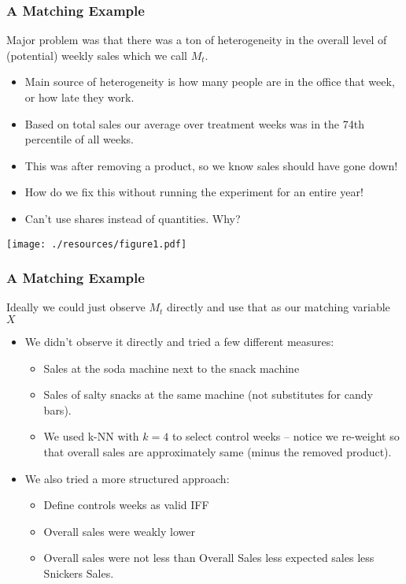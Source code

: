 \documentclass[xcolor=pdftex,dvipsnames,table,mathserif,aspectratio=169]{beamer}
\begin{document}
\begin{frame}
\frametitle{A Matching Example}
Major problem was that there was a ton of heterogeneity in the overall level of (potential) weekly sales which we call $M_t$.
\begin{itemize}
\item Main source of heterogeneity is how many people are in the office that week, or how late they work.
\item Based on total sales our average over treatment weeks was in the 74th percentile of all weeks.
\item This was after removing a product, so we know sales should have gone down!
\item How do we fix this without running the experiment for an entire year!
\item Can't use shares instead of quantities. Why?
\end{itemize}
\end{frame}

\begin{frame}
\begin{center}
\texttt{[image: ./resources/figure1.pdf]}
\end{center}
\end{frame}

\begin{frame}
\frametitle{A Matching Example}
Ideally we could just observe $M_t$ directly and use that as our matching variable $X$
\begin{itemize}
\item We didn't observe it directly and tried a few different measures:
\begin{itemize}
\item Sales at the soda machine next to the snack machine
\item Sales of salty snacks at the same machine (not substitutes for candy bars).
\item We used k-NN with $k=4$ to select control weeks -- notice we re-weight so that overall sales are approximately same (minus the removed product).
\end{itemize}
\item We also tried a more structured approach:
\begin{itemize}
\item Define controls weeks as valid IFF
\item Overall sales were weakly lower
\item Overall sales were not less than Overall Sales less expected sales less Snickers Sales.
\end{itemize}
\end{itemize}
\end{frame}
\end{document}

